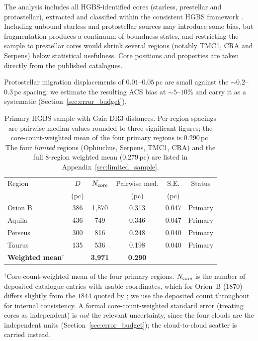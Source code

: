 \documentclass[usenatbib,twoside,twocolumn]{mnras}
\begin{document}
The analysis includes all HGBS-identified cores (starless, prestellar and protostellar), extracted and classified within the consistent HGBS framework \citep{Konyves2015, Konyves2020}. Including unbound starless and protostellar sources may introduce some bias, but fragmentation produces a continuum of boundness states, and restricting the sample to prestellar cores would shrink several regions (notably TMC1, CRA and Serpens) below statistical usefulness. Core positions and properties are taken directly from the published catalogues.

Protostellar migration displacements of $0.01$--$0.05$\,pc \citep{Kirk2016, Mattern2018} are small against the $\sim0.2$--$0.3$\,pc spacing; we estimate the resulting ACS bias at $\sim5$--$10\%$ and carry it as a systematic (Section~\ref{sec:error_budget}).

\begin{table}
\caption{Primary HGBS sample with Gaia DR3 distances. Per-region spacings are pairwise-median values rounded to three significant figures; the core-count-weighted mean of the four primary regions is $0.290$\,pc. The four \emph{limited} regions (Ophiuchus, Serpens, TMC1, CRA) and the full 8-region weighted mean ($0.279$\,pc) are listed in Appendix~\ref{sec:limited_sample}.}
\label{tab:sample}
\footnotesize
\setlength{\tabcolsep}{3pt}
\begin{tabular}{lccccc}
\toprule
Region & $D$ & $N_{\rm core}$ & Pairwise med. & S.E. & Status \\
       & (pc) &  & (pc) & (pc) &  \\
\midrule
Orion B  & 386 & 1,870 & 0.313 & 0.047 & Primary \\
Aquila   & 436 & 749   & 0.346 & 0.047 & Primary \\
Perseus  & 300 & 816   & 0.248 & 0.040 & Primary \\
Taurus   & 135 & 536   & 0.198 & 0.040 & Primary \\
\midrule
\textbf{Weighted mean}$^\dagger$ &  & \textbf{3,971} & \textbf{0.290} & &  \\
\bottomrule
\end{tabular}
\par\vspace{2pt}
\footnotesize $^\dagger$Core-count-weighted mean of the four primary regions. $N_{\rm core}$ is the number of deposited catalogue entries with usable coordinates, which for Orion~B ($1870$) differs slightly from the $1844$ quoted by \citet{Konyves2020}; we use the deposited count throughout for internal consistency. A formal core-count-weighted standard error (treating cores as independent) is \emph{not} the relevant uncertainty, since the four clouds are the independent units (Section~\ref{sec:error_budget}); the cloud-to-cloud scatter is carried instead.
\end{table}
\end{document}
